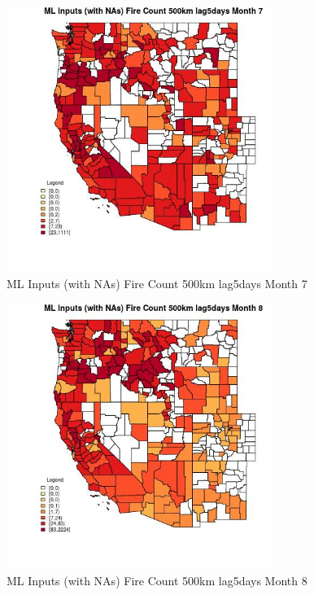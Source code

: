 \begin{figure} 
\centering  
\includegraphics[width=0.77\textwidth]{Code_Outputs/Report_ML_input_PM25_Step4_part_e_de_duplicated_aves_compiled_2019-05-21wNAs_CountyFire_Count_500km_lag5daysmedianMonth7.jpg} 
\caption{\label{fig:Report_ML_input_PM25_Step4_part_e_de_duplicated_aves_compiled_2019-05-21wNAsCountyFire_Count_500km_lag5daysmedianMonth7}ML Inputs (with NAs) Fire Count 500km lag5days Month 7} 
\end{figure} 
 

\begin{figure} 
\centering  
\includegraphics[width=0.77\textwidth]{Code_Outputs/Report_ML_input_PM25_Step4_part_e_de_duplicated_aves_compiled_2019-05-21wNAs_CountyFire_Count_500km_lag5daysmedianMonth8.jpg} 
\caption{\label{fig:Report_ML_input_PM25_Step4_part_e_de_duplicated_aves_compiled_2019-05-21wNAsCountyFire_Count_500km_lag5daysmedianMonth8}ML Inputs (with NAs) Fire Count 500km lag5days Month 8} 
\end{figure} 
 

